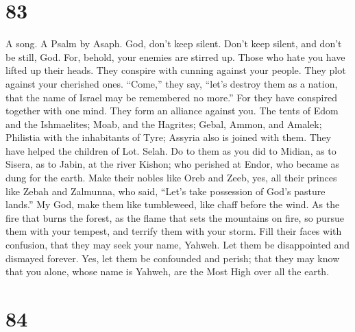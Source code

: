 \hypertarget{section-73}{%
\section{83}\label{section-73}}

A song. A Psalm by Asaph.  God, don't keep silent. Don't
keep silent, and don't be still, God.  For, behold, your
enemies are stirred up. Those who hate you have lifted up their heads.
 They conspire with cunning against your people. They plot
against your cherished ones.  ``Come,'' they say, ``let's
destroy them as a nation, that the name of Israel may be remembered no
more.''  For they have conspired together with one mind.
They form an alliance against you.  The tents of Edom and
the Ishmaelites; Moab, and the Hagrites;  Gebal, Ammon, and
Amalek; Philistia with the inhabitants of Tyre;  Assyria
also is joined with them. They have helped the children of Lot. Selah.
 Do to them as you did to Midian, as to Sisera, as to Jabin,
at the river Kishon;  who perished at Endor, who became as
dung for the earth.  Make their nobles like Oreb and Zeeb,
yes, all their princes like Zebah and Zalmunna,  who said,
``Let's take possession of God's pasture lands.''  My God,
make them like tumbleweed, like chaff before the wind.  As
the fire that burns the forest, as the flame that sets the mountains on
fire,  so pursue them with your tempest, and terrify them
with your storm.  Fill their faces with confusion, that
they may seek your name, Yahweh.  Let them be disappointed
and dismayed forever. Yes, let them be confounded and perish;
 that they may know that you alone, whose name is Yahweh,
are the Most High over all the earth.

\hypertarget{section-74}{%
\section{84}\label{section-74}}


